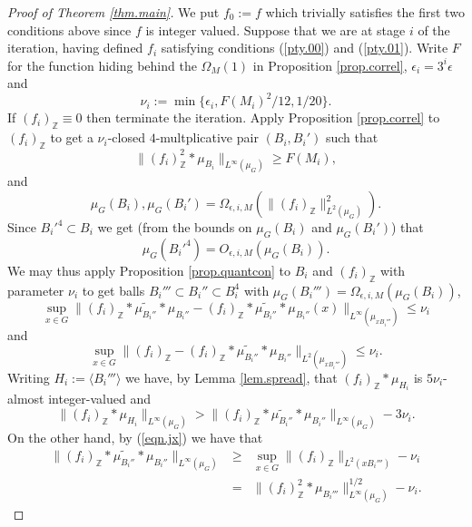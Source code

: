 \documentclass[12pt]{amsart}
\numberwithin{equation}{section}
\theoremstyle{plain}
\theoremstyle{definition}
\renewcommand{\leq}{\leqslant}
\renewcommand{\geq}{\geqslant}
\newcommand{\Z}{\mathbb{Z}}
\begin{document}
\begin{proof}[Proof of Theorem \ref{thm.main}]
We put $f_0:=f$ which trivially satisfies the first two conditions above since $f$ is integer valued.  Suppose that we are at stage $i$ of the iteration, having defined $f_i$ satisfying conditions (\ref{pty.00}) and (\ref{pty.01}).  Write $F$ for the function hiding behind the $\Omega_M(1)$ in Proposition \ref{prop.correl}, $\epsilon_i=3^i\epsilon$ and
\begin{equation*}
\nu_i:=\min\{\epsilon_i,F(M_i)^2/12,1/20\}.
\end{equation*}
If $(f_i)_\Z \equiv 0$ then terminate the iteration.  Apply Proposition \ref{prop.correl} to $(f_i)_{\Z}$ to get a $\nu_i$-closed $4$-multplicative pair $(B_i,B_i')$ such that
\begin{equation}\label{eqn.wp}
\|(f_i)_\Z^2\ast \mu_{B_i}\|_{L^\infty(\mu_G)}\geq F(M_i),
\end{equation}
and
\begin{equation*}
\mu_G(B_i),\mu_G(B_i')=\Omega_{\epsilon,i,M}(\|(f_i)_\Z\|_{L^2(\mu_G)}^2).
\end{equation*}
Since $B_i'^4 \subset B_i$ we get (from the bounds on $\mu_G(B_i)$ and $\mu_G(B_i')$) that
\begin{equation*}
\mu_G(B_i'^4) =O_{\epsilon,i,M}(\mu_G(B_i)).
\end{equation*}
We may thus apply Proposition \ref{prop.quantcon} to $B_i$ and $(f_i)_\Z$ with parameter $\nu_i$ to get balls $B_i''' \subset B_i'' \subset B_i^4$ with  $\mu_G(B_i''')=\Omega_{\epsilon,i,M}(\mu_G(B_i))$,
\begin{equation*}
\sup_{x \in G}{\|(f_i)_\Z\ast\widetilde{\mu_{B_i''}}\ast  \mu_{B_i''}-(f_i)_\Z\ast\widetilde{\mu_{B_i''}}\ast  \mu_{B_i''}(x)\|_{L^\infty(\mu_{xB_i'''})}}\leq \nu_i
\end{equation*}
and
\begin{equation}\label{eqn.jx}
\sup_{x \in G}{\|(f_i)_\Z- (f_i)_\Z\ast\widetilde{\mu_{B_i''}}\ast  \mu_{B_i''}\|_{L^2(\mu_{xB_i'''})}}\leq \nu_i.
\end{equation}
Writing $H_i:=\langle B_i'''\rangle$ we have, by Lemma \ref{lem.spread}, that $(f_i)_\Z \ast \mu_{H_i}$ is $5\nu_i$-almost integer-valued and
\begin{equation}\label{eqn.maass}
\|(f_i)_\Z \ast \mu_{H_i}\|_{L^\infty(\mu_G)} > \|(f_i)_\Z\ast\widetilde{\mu_{B_i''}}\ast  \mu_{B_i''}\|_{L^\infty(\mu_G)} - 3\nu_i.
\end{equation}
On the other hand, by (\ref{eqn.jx}) we have that
\begin{eqnarray*}
\|(f_i)_\Z \ast \widetilde{\mu_{B_i''}} \ast \mu_{B_i''}\|_{L^\infty(\mu_G)}& \geq & \sup_{x \in G}{\|(f_i)_\Z\|_{L^2(xB_i''')}} -\nu_i\\ & = & \|(f_i)_\Z^2 \ast \mu_{B_i'''}\|_{L^\infty(\mu_G)}^{1/2} - \nu_i. 

\end{eqnarray*}
\end{proof}
\end{document}
